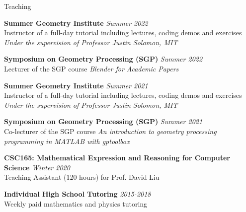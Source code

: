 \documentclass{resume}
\newcommand{\cvitembig}[4]{
    {\bf #1} \hfill {\em \small #2} \\ 
    {\small#3 }\\
    {\it \small #4}
}
\newcommand{\cvitem}[3]{
    {\bf #1} \hfill {\em \small #2} \\ 
    {\small#3 }
}
\begin{document}
\begin{rSection}{Teaching}

\cvitembig{Summer Geometry Institute}{\em Summer 2022}{Instructor of a full-day tutorial including lectures, coding demos and exercises}{Under the supervision of Professor Justin Solomon, MIT}

\cvitem{Symposium on Geometry Processing (SGP)}{Summer 2022}{Lecturer of the SGP course {\it Blender for Academic Papers}}

\cvitembig{Summer Geometry Institute}{Summer 2021}{Instructor of a full-day tutorial including lectures, coding demos and exercises}{Under the supervision of Professor Justin Solomon, MIT}

\cvitem{Symposium on Geometry Processing (SGP)}{Summer 2021}{Co-lecturer of the SGP course {\it An introduction to geometry processing  programming in MATLAB with gptoolbox}}

\cvitem{CSC165: Mathematical Expression and Reasoning for Computer Science}{Winter 2020}{Teaching Assistant (120 hours) for Prof. David Liu}

\cvitem{Individual High School Tutoring}{2015-2018}{Weekly paid mathematics and physics tutoring}

\end{rSection}
\end{document}

